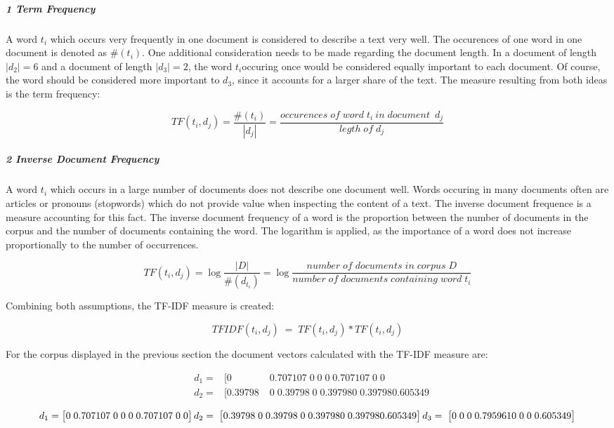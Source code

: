 		\subparagraph{1 Term Frequency}
		
		A word $t_{i} $ which occurs very frequently in one document is considered to describe a text very well. The occurences of one word in one document is denoted as $ \#( t_{i}) $.
		One additional consideration needs to be made regarding the document length. In a document of length $ |d_{2}| = 6 $ and a document of length  $ |d_{3}| = 2 $, the word $ t_{i} $occuring once would be considered equally important to each document. Of course, the word should be considered more important to $ d_{3} $, since it accounts for a larger share of the text. The measure resulting from both ideas is the term frequency:
		
		\[ TF(t_{i}, d_{j}) =   \dfrac{\#( t_{i})}{|d_{j}|} = \dfrac{occurences \; of \; word \; t_{i} \: in \; document \;\:   d_{j}}{legth \; of \; d_{j}} \]
		
		\subparagraph{2 Inverse Document Frequency}
		A word $t_{i} $ which occurs in a large number of documents does not describe one document well. Words occuring in many documents often are articles or pronouns (stopwords) which do not provide value when inspecting the content of a text. The inverse document frequence is a measure accounting for this fact. The inverse document frequency of a word is the proportion between the number of documents in the corpus and the number of documents containing the word. The logarithm is applied, as the importance of a word does not increase proportionally to the number of occurrences.
	
		
		\[ TF(t_{i}, d_{j}) = \log \dfrac{|D|}{\#(d_{t_{i}}) } =  \log \dfrac{number \;  of\;  documents \;  in \; corpus \; D}{ number \; of \; documents \; containing \; word \; t_{i}} \]
		
		Combining both assumptions, the \ac{TF-IDF} measure is created:
		
		\[ TFIDF(t_{i}, d_{j}) \;=\; TF(t_{i}, d_{j}) * TF(t_{i}, d_{j})\]
		
		For the corpus displayed in the previous section the document vectors calculated with the \ac{TF-IDF} measure are:
		
				
		\begin{align}
			&d_1 = & [ 0\;	&0.707107\;	0\;	0\;	0\;	0.707107\;	0\;	0 \\
			&d_2 = & [ 0.39798\;	&0\;	0.39798\;	0\;	0.39798	0\;	0.39798	0.605349 
		\end{align}
			
			\[d_1 = \begin{bmatrix} 0\;	0.707107\;	0\;	0\;	0\;	0.707107\;	0\;	0 \end{bmatrix}	 \\
			d_2 =  \;\begin{bmatrix} 0.39798\;	0\;	0.39798\;	0\;	0.39798	0\;	0.39798	0.605349 \end{bmatrix} \\
			d_3 = \;\begin{bmatrix} 0\;	0\;	0\;	0.795961	0\;	0\;	0\;	0.605349 \end{bmatrix} \]
			
